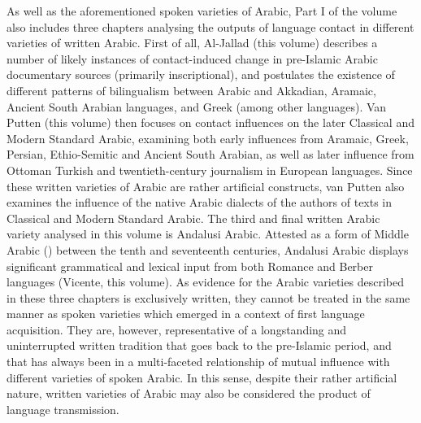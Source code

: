 \documentclass[output=paper]{langsci/langscibook}
\begin{document}
As well as the aforementioned spoken varieties of Arabic, Part I of the volume also includes three chapters analysing the outputs of language contact in different varieties of written Arabic. First of all, Al-Jallad (this volume) describes a number of likely instances of contact-induced change in pre-Islamic Arabic documentary sources (primarily inscriptional), and postulates the existence of different patterns of bilingualism between Arabic and Akkadian, Aramaic, Ancient South Arabian languages, and Greek (among other languages). Van Putten (this volume) then focuses on contact influences on the later Classical and Modern Standard Arabic, examining both early influences from Aramaic, Greek, Persian, Ethio-Semitic and Ancient South Arabian, as well as later influence from Ottoman Turkish and twentieth-century journalism in European languages. Since these written varieties of Arabic are rather artificial constructs, van Putten also examines the influence of the native Arabic dialects of the authors of texts in Classical and Modern Standard Arabic. The third and final written Arabic variety analysed in this volume is Andalusi Arabic. Attested as a form of Middle Arabic (\citealt{Lentin2011Middle}) between the tenth and seventeenth centuries, Andalusi Arabic displays significant grammatical and lexical input from both Romance and Berber languages (Vicente, this volume). As evidence for the Arabic varieties described in these three chapters is exclusively written, they cannot be treated in the same manner as spoken varieties which emerged in a context of first language acquisition. They are, however, representative of a longstanding and uninterrupted written tradition that goes back to the pre-Islamic period, and that has always been in a multi-faceted relationship of mutual influence with different varieties of spoken Arabic. In this sense, despite their rather artificial nature, written varieties of Arabic may also be considered the product of language transmission. 
\end{document}
